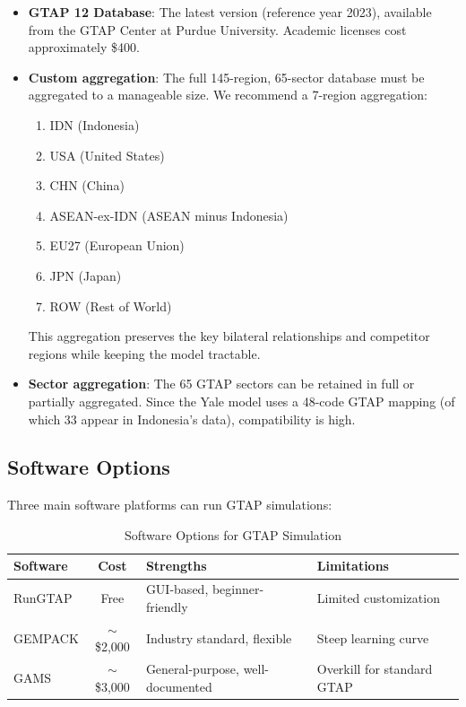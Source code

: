 \documentclass[12pt,a4paper]{article}
\begin{document}
\begin{itemize}
    \item \textbf{GTAP 12 Database}: The latest version (reference year 2023), available from the GTAP Center at Purdue University. Academic licenses cost approximately \$400.
    \item \textbf{Custom aggregation}: The full 145-region, 65-sector database must be aggregated to a manageable size. We recommend a 7-region aggregation:
    \begin{enumerate}
        \item IDN (Indonesia)
        \item USA (United States)
        \item CHN (China)
        \item ASEAN-ex-IDN (ASEAN minus Indonesia)
        \item EU27 (European Union)
        \item JPN (Japan)
        \item ROW (Rest of World)
    \end{enumerate}
    This aggregation preserves the key bilateral relationships and competitor regions while keeping the model tractable.
    \item \textbf{Sector aggregation}: The 65 GTAP sectors can be retained in full or partially aggregated. Since the Yale model uses a 48-code GTAP mapping (of which 33 appear in Indonesia's data), compatibility is high.
\end{itemize}

\subsection{Software Options}

Three main software platforms can run GTAP simulations:

\begin{table}[htbp]
\centering
\caption{Software Options for GTAP Simulation}
\begin{tabular}{lcll}
\toprule
\textbf{Software} & \textbf{Cost} & \textbf{Strengths} & \textbf{Limitations} \\
\midrule
RunGTAP  & Free     & GUI-based, beginner-friendly & Limited customization \\
GEMPACK  & $\sim$\$2,000 & Industry standard, flexible  & Steep learning curve \\
GAMS     & $\sim$\$3,000 & General-purpose, well-documented & Overkill for standard GTAP \\
\bottomrule
\end{tabular}
\label{tab:software}
\end{table}
\end{document}
